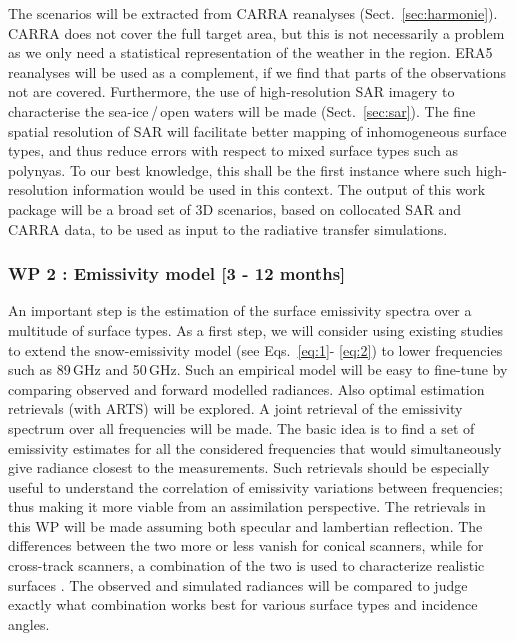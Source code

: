 \documentclass[12pt,oneside,a4paper]{article}
\begin{document}
\label{sec:atmscenes}
The scenarios will be extracted from CARRA reanalyses
(Sect.~\ref{sec:harmonie}). CARRA does not cover the full target area, but this
is not necessarily a problem as we only need a statistical representation of
the weather in the region. ERA5 reanalyses will be used as a complement, if we
find that parts of the observations not are covered. Furthermore, the use of
high-resolution SAR imagery to characterise the sea-ice\,/\,open waters will be
made (Sect.~\ref{sec:sar}). The fine spatial resolution of SAR will
facilitate better mapping of inhomogeneous surface types, and thus reduce
errors with respect to mixed surface types such as polynyas. To our best
knowledge, this shall be the first instance where such high-resolution
information would be used in this context. The output of this work package will
be a broad set of 3D scenarios, based on collocated SAR and CARRA data, to be
used as input to the radiative transfer simulations. \vspace{-1.0ex}


\subsubsection*{WP 2 : Emissivity model [3 - 12 months]}

%
\label{sec:emissivity}
An important step is the estimation of the surface emissivity spectra over a
multitude of surface types. As a first step, we will consider using existing
studies to extend the snow-emissivity model (see Eqs.~\ref{eq:1}- \ref{eq:2})
to lower frequencies such as 89\,GHz and 50\,GHz. Such an empirical model will
be easy to fine-tune by comparing observed and forward modelled radiances. Also
optimal estimation retrievals (with ARTS) will be explored. A joint retrieval
of the emissivity spectrum over all frequencies will be made. The basic idea is
to find a set of emissivity estimates for all the considered frequencies that
would simultaneously give radiance closest to the measurements. Such retrievals
should be especially useful to understand the correlation of emissivity
variations between frequencies; thus making it more viable from an assimilation
perspective. The retrievals in this WP will be made assuming both specular and
lambertian reflection. The differences between the two more or less vanish for
conical scanners, while for cross-track scanners, a combination of the two is
used to characterize realistic surfaces \citep{matzler:2005:onthe}. The
observed and simulated radiances will be compared to judge exactly what
combination works best for various surface types and incidence angles.
\end{document}
